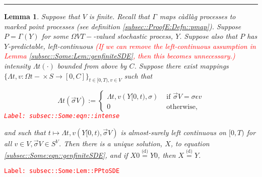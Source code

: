 \documentclass[12pt]{article}
\newcommand{\ra}{\rightarrow}
\newcommand{\te}{\text}
\newcommand{\ep}{\epsilon}
\newcommand{\tr}{\textcolor{red}}
\newcommand{\labe}[1]{\tr{\texttt{Label: #1}}}
\newcommand{\lin}{\rule{\linewidth}{0.4 pt}}
\newcommand{\deq}{\overset{\text{(d)}}{=}}			%
\renewcommand{\v}{v}							%
\renewcommand{\S}{S}							%
\newcommand{\s}{\sigma}							%
\newcommand{\sv}{\vec{\s}}						%
\newcommand{\ev}{\ep}							%
\newcommand{\T}{T}								%
\renewcommand{\t}{t}							%
\newcommand{\X}{X}								%
\newcommand{\const}{C}							%
\newcommand{\XX}{Y}								%
\newcommand{\pmap}[1]{\Gamma_{#1}}				%
\newcommand{\rp}{P}								%
\newcommand{\ratee}{\Lambda}					%
\newtheorem{lem}[thms]{Lemma}
\begin{document}
\lin

\begin{lem}
Suppose that \( V\) is finite. Recall that \(\pmap{}\) maps c\`adl\`ag processes to marked point processes (see definition \ref{subsec::ProofE:Defn::pmap}). Suppose \(\rp{} = \pmap{}(\XX{}{})\) for some \(\Omega{ V}{\T-}\)-valued stochastic process, \(\XX{}{}\). Suppose also that \(\rp{}\) has \(\XX{}{}\)-predictable, left-continuous \tr{(If we can remove the left-continuous assumption in Lemma \ref{subsec::Some:Lem::genfiniteSDE}, then this becomes unnecessary.)} intensity \(\ratee{\t}(\cdot)\) bounded from above by \(\const{}\). Suppose there exist mappings \(\{\ratee{\t,\v}:\Omega{}{\t-}\times \S \ra [0,\const{}]\}_{\t\in[0,\T),\v\in  V}\) such that 

\begin{equation}
\ratee{\t}(\sv{}{ V}) := \begin{cases}
\ratee{\t,\v}(\XX{}{[0,\t)},\s) &\te{ if } \sv{}{ V} = \s\ev{\v}\\
0 &\te{ otherwise,}
\end{cases}
\label{subsec::Some:eqn::intense}
\end{equation}
\labe{subsec::Some:eqn::intense}

and such that \(\t\mapsto \ratee{\t,\v}(\XX{}{[0,\t)},\sv{}{ V})\) is almost-surely left continuous on \([0,\T)\) for all \(\v\in  V,\sv{}{ V}\in \S^ V\). Then there is a unique solution, \(\X{}{}\), to equation \eqref{subsec::Some:eqn::genfiniteSDE}, and if \(\X{}{0} \deq \XX{}{0}\), then \(\X{}{} \deq \XX{}{}\).

\label{subsec::Some:Lem::PPtoSDE}
\end{lem}
\labe{subsec::Some:Lem::PPtoSDE}
\end{document}
